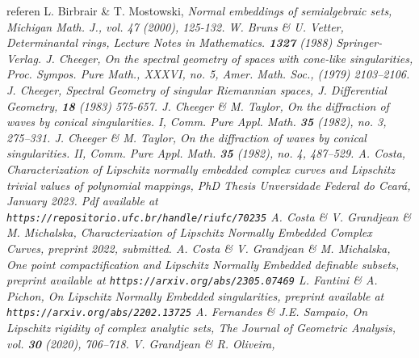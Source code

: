 \documentclass[11pt]{amsart}
\numberwithin{equation}{section}
\numberwithin{equation}{section}
\begin{document}
%
%
%
%
%
%
%
%
%
%
%
%
%
%
%
%
%
%
%
%
%
%
%
%
%
%
%
%
%
%
%
%
%
%
%
%
%
%
%
%
\begin{thebibliography}{referen} %
%
 \sc L. Birbrair \& T. Mostowski, 
\em Normal embeddings of semialgebraic sets, 
\rm Michigan Math. J., vol. 47 (2000), 125-132.
%
 \sc W. Bruns \& U. Vetter,
\rm Determinantal rings, 
\rm Lecture Notes in Mathematics. {\bf 1327} (1988) Springer-Verlag.
%
%
 \sc J. Cheeger,
\em On the spectral geometry of spaces with cone-like singularities,
\rm Proc. Sympos. Pure Math., XXXVI, no. 5, Amer. Math. Soc., (1979)  2103--2106. 
%
 \sc J. Cheeger,
\em Spectral Geometry of singular Riemannian spaces,
\rm J. Differential Geometry, {\bf 18} (1983) 575-657.
%
 \sc J. Cheeger \& M. Taylor,
\em On the diffraction of waves by conical singularities. I,
\rm Comm. Pure Appl. Math. {\bf 35} (1982), no. 3, 275--331.
% 
 \sc J. Cheeger \& M. Taylor,
\em On the diffraction of waves by conical singularities. II,
\rm Comm. Pure Appl. Math. {\bf 35} (1982), no. 4, 487--529.
%
 \sc A. Costa,
\em Characterization of Lipschitz normally embedded complex curves and 
Lipschitz trivial values of polynomial mappings,
\rm PhD  Thesis Unversidade Federal do Cear\'a, January 2023. Pdf available at
{\tt https://repositorio.ufc.br/handle/riufc/70235}
%
%
 \sc A. Costa \& V. Grandjean \& M. Michalska, 
\em Characterization of Lipschitz Normally Embedded Complex Curves,
\rm preprint 2022, submitted.
%
 \sc A. Costa \& V. Grandjean \& M. Michalska, 
\em One point compactification and Lipschitz Normally Embedded definable
subsets, \rm preprint available at {\tt https://arxiv.org/abs/2305.07469}
%
 \sc L. Fantini \& A. Pichon,
\em On Lipschitz Normally Embedded singularities,
\rm preprint available at 
{\tt https://arxiv.org/abs/2202.13725} 
%
 \sc A. Fernandes \& J.E. Sampaio,
\em On Lipschitz rigidity of complex analytic sets,
\rm The Journal of Geometric Analysis, vol. {\bf 30} (2020), 706--718.
%
 \sc V. Grandjean \& R. Oliveira,

\end{thebibliography}
\end{document}
